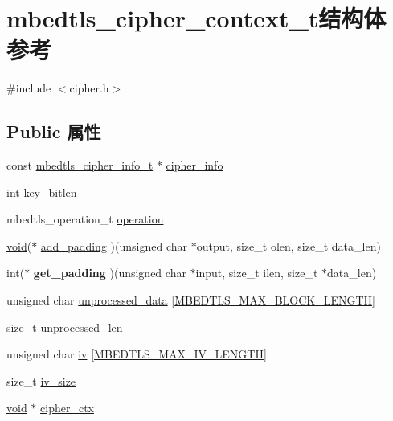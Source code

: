 \hypertarget{structmbedtls__cipher__context__t}{}\section{mbedtls\+\_\+cipher\+\_\+context\+\_\+t结构体 参考}
\label{structmbedtls__cipher__context__t}


{\ttfamily \#include $<$cipher.\+h$>$}

\subsection*{Public 属性}
\begin{DoxyCompactItemize}
\item 
const \hyperlink{structmbedtls__cipher__info__t}{mbedtls\+\_\+cipher\+\_\+info\+\_\+t} $\ast$ \hyperlink{structmbedtls__cipher__context__t_a7673da39ff63a88c9b85769048884dae}{cipher\+\_\+info}
\item 
int \hyperlink{structmbedtls__cipher__context__t_ac949d799444e6379acf0125891c04763}{key\+\_\+bitlen}
\item 
mbedtls\+\_\+operation\+\_\+t \hyperlink{structmbedtls__cipher__context__t_a0075f60f220daa87578223a2022ba405}{operation}
\item 
\hyperlink{interfacevoid}{void}($\ast$ \hyperlink{structmbedtls__cipher__context__t_a1c9ca536bde6b0da3bd3c57a50c1ea8f}{add\+\_\+padding} )(unsigned char $\ast$output, size\+\_\+t olen, size\+\_\+t data\+\_\+len)
\item 
\mbox{\label{structmbedtls__cipher__context__t_a60c17ef8d5ea5490d5927ae95262a967}} 
int($\ast$ {\bfseries get\+\_\+padding} )(unsigned char $\ast$input, size\+\_\+t ilen, size\+\_\+t $\ast$data\+\_\+len)
\item 
unsigned char \hyperlink{structmbedtls__cipher__context__t_a3fc86dfa20e0131377692ee07fb5b8f0}{unprocessed\+\_\+data} \mbox{[}\hyperlink{cipher_8h_ab8f30dc90403204515f868c3b6196ffd}{M\+B\+E\+D\+T\+L\+S\+\_\+\+M\+A\+X\+\_\+\+B\+L\+O\+C\+K\+\_\+\+L\+E\+N\+G\+TH}\mbox{]}
\item 
size\+\_\+t \hyperlink{structmbedtls__cipher__context__t_ad9bb94ad0e914bdceb20190cfebfc702}{unprocessed\+\_\+len}
\item 
unsigned char \hyperlink{structmbedtls__cipher__context__t_a19262f2c275b31180e7412f4bcef0e7f}{iv} \mbox{[}\hyperlink{cipher_8h_aec294721b811aa0f7dcc940029fd8aab}{M\+B\+E\+D\+T\+L\+S\+\_\+\+M\+A\+X\+\_\+\+I\+V\+\_\+\+L\+E\+N\+G\+TH}\mbox{]}
\item 
size\+\_\+t \hyperlink{structmbedtls__cipher__context__t_af11d1d21da68ef00a46d96d9de326206}{iv\+\_\+size}
\item 
\hyperlink{interfacevoid}{void} $\ast$ \hyperlink{structmbedtls__cipher__context__t_a5b7e2044b5186a4ee57456f6f927ad80}{cipher\+\_\+ctx}
\end{DoxyCompactItemize}


